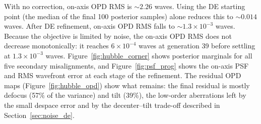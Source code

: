 With no correction, on-axis OPD RMS is $\sim 2.26$ waves. Using the DE starting point (the median of the final 100 posterior samples) alone reduces this to $\sim 0.014$ waves. After DE refinement, on-axis OPD RMS falls to $\sim 1.3\times 10^{-3}$ waves. Because the objective is limited by noise, the on-axis OPD RMS does not decrease monotonically: it reaches $6\times10^{-4}$ waves at generation 39 before settling at $1.3\times10^{-3}$ waves. Figure~\ref{fig:hubble_corner} shows posterior marginals for all five secondary misalignments, and Figure~\ref{fig:psf_prog} shows the on-axis PSF and RMS wavefront error at each stage of the refinement. The residual OPD maps (Figure~\ref{fig:hubble_opd}) show what remains: the final residual is mostly defocus (57\% of the variance) and tilt (39\%), the low-order aberrations left by the small despace error and by the decenter--tilt trade-off described in Section~\ref{sec:noise_de}.